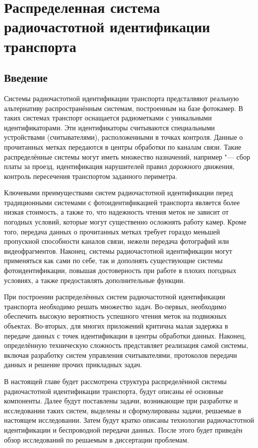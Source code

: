 \chapter{Распределенная система радиочастотной идентификации транспорта}\label{ch:ch1}

\section{Введение}\label{sec:ch1_intro}

Системы радиочастотной идентификации транспорта предсталвяют реальную альтернативу распространённым системам, построенным на базе фотокамер. В таких системах транспорт оснащается радиометками с уникальными идентификаторами. Эти идентификаторы считываются специальными устройствами (считывателями), расположенными в точках контроля. Данные о прочитанных метках передаются в центры обработки по каналам связи. Такие распределённые системы могут иметь множество назначений, например "--- сбор платы за проезд, идентификация нарушителей правил дорожного движения, контроль пересечения транспортом заданного периметра.

Ключевыми преимуществами систем радиочастотной идентификации перед традиционными системами с фотоидентификацией транспорта является более низкая стоимость, а также то, что надежность чтения меток не зависит от погодных условий, которые могут существенно осложнять работу камер. Кроме того, передача данных о прочитанных метках требует гораздо меньшей пропускной способности каналов связи, нежели передача фотографий или видеофрагментов. Наконец, системы радиочастотной идентификации могут применяться как сами по себе, так и дополнять существующие системы фотоидентификации, повышая достоверность при работе в плохих погодных условиях, а также предоставлять дополнительные функции.

При построении распределённых систем радиочастотной идентификации транспорта необходимо решать множество задач. Во-первых, необходимо обеспечить высокую вероятность успешного чтения меток на подвижных объектах. Во-вторых, для многих приложений критична малая задержка в передаче данных с точек идентификации в центры обработки данных. Наконец, определённую техническую сложность представляет реализация самой системы, включая разработку систем управления считывателями, протоколов передачи данных и решение прочих прикладных задач.

В настоящей главе будет рассмотрена структура распределённой системы радиочастотной идентификации транспорта, будут описаны её основные компоненты. Далее будут поставлены задачи, возникающие при разработке и исследовании таких систем, выделены и сформулированы задачи, решаемые в настоящем исследовании. Затем будут кратко описаны технологии радиочастотной идентификации и беспроводной передачи данных. После этого будет приведён обзор исследований по решаемым в диссертации проблемам.

